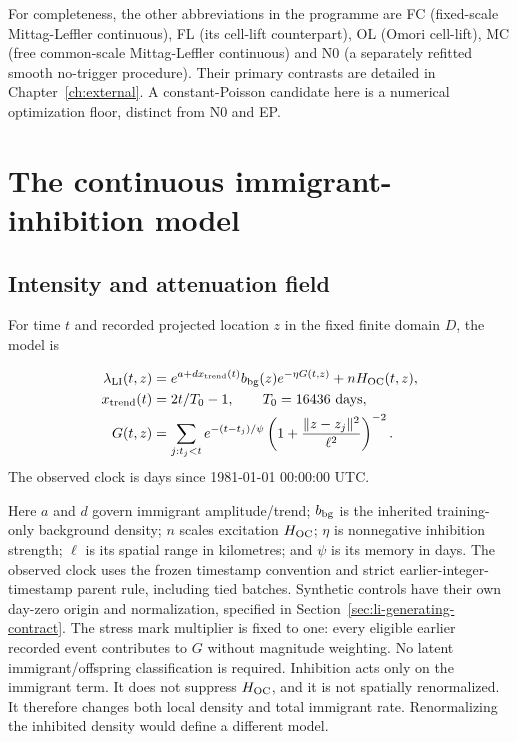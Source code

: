 For completeness, the other abbreviations in the programme are FC (fixed-scale Mittag-Leffler continuous), FL (its cell-lift counterpart), OL (Omori cell-lift), MC (free common-scale Mittag-Leffler continuous) and N0 (a separately refitted smooth no-trigger procedure). Their primary contrasts are detailed in Chapter~\ref{ch:external}. A constant-Poisson candidate here is a numerical optimization floor, distinct from N0 and EP.

\section{The continuous immigrant-inhibition model}

\subsection{Intensity and attenuation field}

For time $t$ and recorded projected location $z$ in the fixed finite domain $D$, the model is

\begin{align}
\lambda_{\rm LI}(t,z)&=e^{a+dx_{\mathrm{trend}}(t)}b_{\rm bg}(z)e^{-\eta G(t,z)}+nH_{\rm OC}(t,z),\label{eq:spatial-li-intensity}\\
x_{\mathrm{trend}}(t)&=2t/T_0-1,\qquad T_0=16436\ \text{days},\\
G(t,z)&=\sum_{j:t_j<t}e^{-(t-t_j)/\psi}
\left(1+\frac{\lVert z-z_j\rVert^2}{\ell^2}\right)^{-2}.\label{eq:spatial-li-field}
\end{align}
The observed clock is days since 1981-01-01 00:00:00 UTC.

Here $a$ and $d$ govern immigrant amplitude/trend; $b_{\rm bg}$ is the inherited training-only background density; $n$ scales excitation $H_{\rm OC}$; $\eta$ is nonnegative inhibition strength; $\ell$ is its spatial range in kilometres; and $\psi$ is its memory in days. The observed clock uses the frozen timestamp convention and strict earlier-integer-timestamp parent rule, including tied batches. Synthetic controls have their own day-zero origin and normalization, specified in Section~\ref{sec:li-generating-contract}. The stress mark multiplier is fixed to one: every eligible earlier recorded event contributes to $G$ without magnitude weighting. No latent immigrant/offspring classification is required. Inhibition acts only on the immigrant term. It does not suppress $H_{\rm OC}$, and it is not spatially renormalized. It therefore changes both local density and total immigrant rate. Renormalizing the inhibited density would define a different model.

